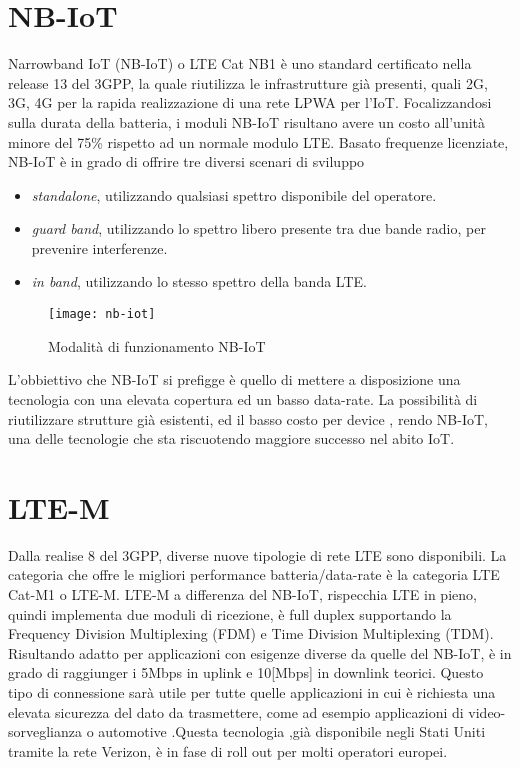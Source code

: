 \section{NB-IoT}
Narrowband IoT (NB-IoT) o LTE Cat NB1 è uno standard certificato nella release 13 del 3GPP, la
quale riutilizza le infrastrutture già presenti, quali 2G, 3G, 4G per la rapida
realizzazione di una rete LPWA per l'IoT.
Focalizzandosi sulla durata della batteria, i moduli NB-IoT risultano avere un
costo all'unità minore del 75\% rispetto ad un normale modulo LTE.
Basato frequenze licenziate, NB-IoT è in grado di
offrire tre diversi scenari di sviluppo \cite{NB-white_paper}
\begin{itemize}
\item \emph{standalone}, utilizzando qualsiasi spettro disponibile del
operatore.
\item \emph{guard band}, utilizzando lo spettro libero presente tra due bande
radio, per prevenire interferenze.
\item \emph{in band}, utilizzando lo stesso spettro della banda LTE.
\end{itemize}
\begin{figure}[h]
    \centering 
        \texttt{[image: nb-iot]}
    \caption{Modalità di funzionamento NB-IoT}
\end{figure}
L'obbiettivo che NB-IoT si prefigge è quello di mettere a disposizione una
tecnologia con una elevata copertura ed un basso data-rate. La possibilità di
riutilizzare strutture già esistenti, ed il basso costo per device , rendo
NB-IoT, una delle tecnologie che sta riscuotendo maggiore successo nel abito IoT.



\section{LTE-M}
Dalla realise 8 del 3GPP, diverse nuove tipologie di rete LTE sono disponibili.
La categoria che offre le migliori performance batteria/data-rate è la categoria
LTE Cat-M1 o LTE-M.
LTE-M a differenza del NB-IoT, rispecchia LTE in pieno, quindi implementa due
moduli di ricezione, è full duplex supportando la Frequency Division Multiplexing
(FDM) e Time Division Multiplexing (TDM). Risultando adatto per applicazioni con
esigenze diverse da quelle del NB-IoT, è in grado di raggiunger i 5Mbps in
uplink e 10[Mbps] in downlink teorici.  Questo tipo di connessione sarà utile
per tutte quelle applicazioni in cui è richiesta una elevata sicurezza del dato
da trasmettere, come ad esempio applicazioni di video-sorveglianza o automotive
.Questa tecnologia ,già disponibile negli Stati Uniti tramite la rete Verizon, è
in fase di roll out per molti operatori europei.

